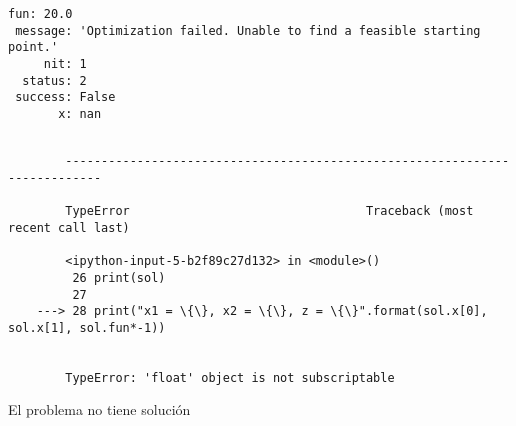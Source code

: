 \documentclass[11pt]{article}
\begin{document}
    \begin{Verbatim}[commandchars=\\\{\}]
     fun: 20.0
 message: 'Optimization failed. Unable to find a feasible starting point.'
     nit: 1
  status: 2
 success: False
       x: nan

    \end{Verbatim}

    \begin{Verbatim}[commandchars=\\\{\}]

        ---------------------------------------------------------------------------

        TypeError                                 Traceback (most recent call last)

        <ipython-input-5-b2f89c27d132> in <module>()
         26 print(sol)
         27 
    ---> 28 print("x1 = \{\}, x2 = \{\}, z = \{\}".format(sol.x[0], sol.x[1], sol.fun*-1))
    

        TypeError: 'float' object is not subscriptable

    \end{Verbatim}

    El problema no tiene solución


    
    
    
    
\end{document}
